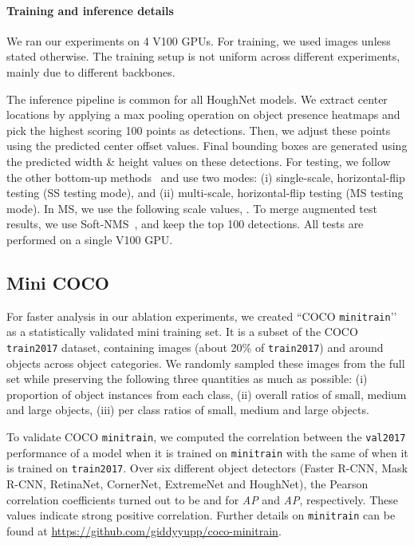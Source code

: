 \documentclass[runningheads]{llncs}
\begin{document}
\paragraph{\textbf{Training and inference details}} We ran our experiments on 4 V100 GPUs. For training, we used  images unless stated otherwise. The training setup is not uniform across different experiments, mainly due to different backbones. 




The inference pipeline is common for all HoughNet models.  We extract center locations by applying a  max pooling operation on object presence heatmaps and pick the highest scoring 100 points as detections. Then, we adjust these points using the predicted center offset values. Final bounding boxes are generated using the predicted width \& height values on these detections.
For testing, we follow the other bottom-up methods~\cite{extremenet, centernet, cornernet} and use two modes: (i) single-scale, horizontal-flip testing (SS testing mode), and (ii) multi-scale, horizontal-flip testing (MS testing mode). In MS, we use the following scale values, . To merge augmented test results, we use Soft-NMS~\cite{softnms}, and keep the top 100 detections. All tests are performed on a single V100 GPU. 
\subsection{Mini COCO}


For faster analysis in our ablation experiments, we created ``COCO \texttt{minitrain}’’ as a statistically validated mini training set. It is a subset of the COCO \texttt{train2017} dataset,  containing  images (about 20\% of \texttt{train2017}) and around  objects across  object categories. We randomly sampled these images from the full set while preserving the following three quantities as much as possible: (i) proportion of object instances from each class, (ii) overall ratios of small, medium and large objects, (iii) per class ratios of small, medium and large objects. 






To validate COCO \texttt{minitrain}, we computed the correlation between the \texttt{val2017} performance of a model when it is trained on \texttt{minitrain} with the same of when it is trained on \texttt{train2017}. Over  six different object detectors (Faster R-CNN, Mask R-CNN, RetinaNet, CornerNet, ExtremeNet and HoughNet), the Pearson correlation coefficients turned out to be   and  for \textit{AP}  and \textit{AP},  respectively. These values indicate strong positive correlation. Further details on  \texttt{minitrain} can be found at \url{https://github.com/giddyyupp/coco-minitrain}.  
\end{document}

